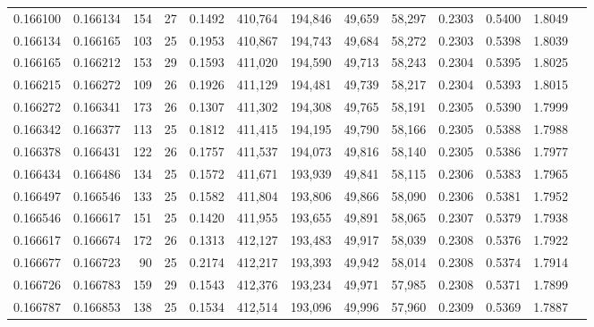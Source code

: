 \begin{tabular}{rrrrrrrrrrrrr}
0.166100 & 0.166134 & 154 &  27 &                                     0.1492 & 410,764 & 194,846 &  49,659 &  58,297 & 0.2303 & 0.5400 & 1.8049 \\
0.166134 & 0.166165 & 103 &  25 &                                     0.1953 & 410,867 & 194,743 &  49,684 &  58,272 & 0.2303 & 0.5398 & 1.8039 \\
0.166165 & 0.166212 & 153 &  29 &                                     0.1593 & 411,020 & 194,590 &  49,713 &  58,243 & 0.2304 & 0.5395 & 1.8025 \\
0.166215 & 0.166272 & 109 &  26 &                                     0.1926 & 411,129 & 194,481 &  49,739 &  58,217 & 0.2304 & 0.5393 & 1.8015 \\
0.166272 & 0.166341 & 173 &  26 &                                     0.1307 & 411,302 & 194,308 &  49,765 &  58,191 & 0.2305 & 0.5390 & 1.7999 \\
0.166342 & 0.166377 & 113 &  25 &                                     0.1812 & 411,415 & 194,195 &  49,790 &  58,166 & 0.2305 & 0.5388 & 1.7988 \\
0.166378 & 0.166431 & 122 &  26 &                                     0.1757 & 411,537 & 194,073 &  49,816 &  58,140 & 0.2305 & 0.5386 & 1.7977 \\
0.166434 & 0.166486 & 134 &  25 &                                     0.1572 & 411,671 & 193,939 &  49,841 &  58,115 & 0.2306 & 0.5383 & 1.7965 \\
0.166497 & 0.166546 & 133 &  25 &                                     0.1582 & 411,804 & 193,806 &  49,866 &  58,090 & 0.2306 & 0.5381 & 1.7952 \\
0.166546 & 0.166617 & 151 &  25 &                                     0.1420 & 411,955 & 193,655 &  49,891 &  58,065 & 0.2307 & 0.5379 & 1.7938 \\
0.166617 & 0.166674 & 172 &  26 &                                     0.1313 & 412,127 & 193,483 &  49,917 &  58,039 & 0.2308 & 0.5376 & 1.7922 \\
0.166677 & 0.166723 &  90 &  25 &                                     0.2174 & 412,217 & 193,393 &  49,942 &  58,014 & 0.2308 & 0.5374 & 1.7914 \\
0.166726 & 0.166783 & 159 &  29 &                                     0.1543 & 412,376 & 193,234 &  49,971 &  57,985 & 0.2308 & 0.5371 & 1.7899 \\
0.166787 & 0.166853 & 138 &  25 &                                     0.1534 & 412,514 & 193,096 &  49,996 &  57,960 & 0.2309 & 0.5369 & 1.7887 \\

\end{tabular}
